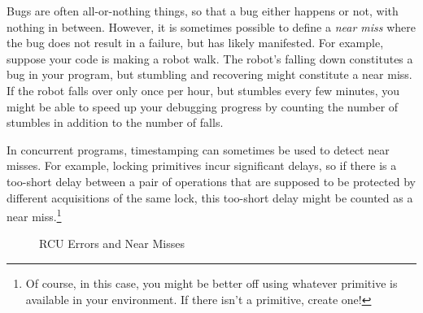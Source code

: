 Bugs are often all-or-nothing things, so that a bug either happens
or not, with nothing in between.
However, it is sometimes possible to define a \emph{near miss} where
the bug does not result in a failure, but has likely manifested.
For example, suppose your code is making a robot walk.
The robot's falling down constitutes a bug in your program, but
stumbling and recovering might constitute a near miss.
If the robot falls over only once per hour, but stumbles every few
minutes, you might be able to speed up your debugging progress by
counting the number of stumbles in addition to the number of falls.

In concurrent programs, timestamping can sometimes be used to detect
near misses.
For example, locking primitives incur significant delays, so if there is
a too-short delay between a pair of operations that are supposed
to be protected by different acquisitions of the same lock, this too-short
delay might be counted as a near miss.\footnote{
	Of course, in this case, you might be better off using
	whatever  primitive is available
	in your environment.
	If there isn't a  primitive, create one!}

\begin{figure}[tbp]
\centering
{}
\caption{RCU Errors and Near Misses}
\label{fig:debugging:RCU Errors and Near Misses}
\end{figure}

